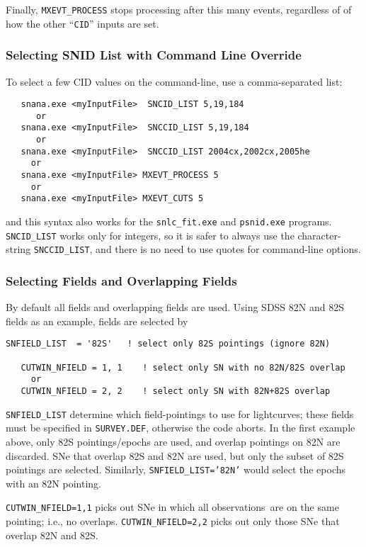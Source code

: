 \documentclass[12pt]{article}
\newcommand{\obss}{observations}
\begin{document}
Finally, {\tt MXEVT\_PROCESS} stops processing after this many
events, regardless of of how the other ``{\tt CID}'' inputs are set.

\subsubsection{Selecting SNID List with Command Line Override}

To select a few CID values on the command-line, 
use a comma-separated list:
\begin{verbatim}
   snana.exe <myInputFile>  SNCID_LIST 5,19,184
      or
   snana.exe <myInputFile>  SNCCID_LIST 5,19,184
      or
   snana.exe <myInputFile>  SNCCID_LIST 2004cx,2002cx,2005he
     or
   snana.exe <myInputFile> MXEVT_PROCESS 5
     or
   snana.exe <myInputFile> MXEVT_CUTS 5
\end{verbatim} 
%
and this syntax also works for the {\tt snlc\_fit.exe} and {\tt psnid.exe}
programs. {\tt SNCID\_LIST} works only for integers, so it is safer
to always use the character-string {\tt SNCCID\_LIST}, 
and there is no need to use quotes for command-line options.


\subsubsection{Selecting Fields and Overlapping Fields}
%
By default all fields and overlapping fields are used.
Using SDSS 82N and 82S fields as an example,
fields are selected by
%
\begin{Verbatim}[frame=single]
   SNFIELD_LIST  = '82S'   ! select only 82S pointings (ignore 82N)

   CUTWIN_NFIELD = 1, 1    ! select only SN with no 82N/82S overlap
     or
   CUTWIN_NFIELD = 2, 2    ! select only SN with 82N+82S overlap
\end{Verbatim}
%
{\tt SNFIELD\_LIST} determine which field-pointings to 
use for lightcurves; these fields must be specified in 
{\tt SURVEY.DEF}, otherwise the code aborts.
In the first example above, only 82S pointings/epochs
are used, and overlap pointings on 82N are discarded.
SNe that overlap 82S and 82N are used, but only the 
subset of 82S pointings are selected.
Similarly, {\tt SNFIELD\_LIST='82N'} would select the epochs
with an 82N pointing.

{\tt CUTWIN\_NFIELD=1,1} picks out SNe in which all \obss\
are on the same pointing; i.e., no overlaps. 
{\tt CUTWIN\_NFIELD=2,2} picks out only those SNe  that
overlap 82N and 82S.
\end{document}
